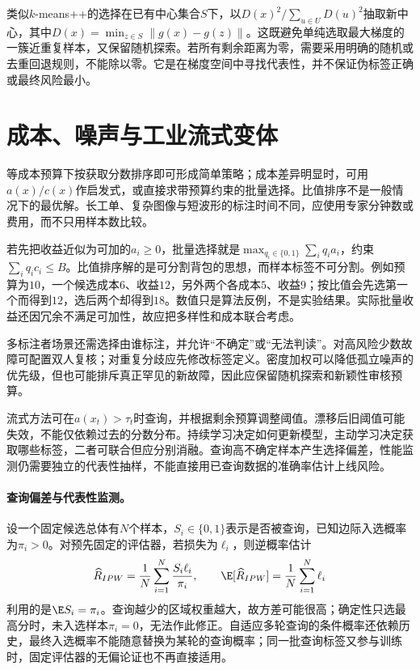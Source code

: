 类似$k$-means++的选择在已有中心集合$S$下，以$D(x)^2/\sum_{u\in U}D(u)^2$抽取新中心，其中$D(x)=\min_{z\in S}\|g(x)-g(z)\|$。这既避免单纯选取最大梯度的一簇近重复样本，又保留随机探索。若所有剩余距离为零，需要采用明确的随机或去重回退规则，不能除以零。它是在梯度空间中寻找代表性，并不保证伪标签正确或最终风险最小。

\section{成本、噪声与工业流式变体}
等成本预算下按获取分数排序即可形成简单策略；成本差异明显时，可用$a(x)/c(x)$作启发式，或直接求带预算约束的批量选择。比值排序不是一般情况下的最优解。长工单、复杂图像与短波形的标注时间不同，应使用专家分钟数或费用，而不只用样本数比较。

若先把收益近似为可加的$a_i\geq0$，批量选择就是$\max_{q_i\in\{0,1\}}\sum_iq_ia_i$，约束$\sum_iq_ic_i\leq B$。比值排序解的是可分割背包的思想，而样本标签不可分割。例如预算为$10$，一个候选成本$6$、收益$12$，另外两个各成本$5$、收益$9$；按比值会先选第一个而得到$12$，选后两个却得到$18$。数值只是算法反例，不是实验结果。实际批量收益还因冗余不满足可加性，故应把多样性和成本联合考虑。

多标注者场景还需选择由谁标注，并允许“不确定”或“无法判读”。对高风险少数故障可配置双人复核；对重复分歧应先修改标签定义。密度加权可以降低孤立噪声的优先级，但也可能排斥真正罕见的新故障，因此应保留随机探索和新颖性审核预算。

流式方法可在$a(x_t)>\tau_t$时查询，并根据剩余预算调整阈值。漂移后旧阈值可能失效，不能仅依赖过去的分数分布。持续学习决定如何更新模型，主动学习决定获取哪些标签，二者可联合但应分别消融。查询高不确定样本产生选择偏差，性能监测仍需要独立的代表性抽样，不能直接用已查询数据的准确率估计上线风险。

\paragraph{查询偏差与代表性监测。}
设一个固定候选总体有$N$个样本，$S_i\in\{0,1\}$表示是否被查询，已知边际入选概率为$\pi_i>0$。对预先固定的评估器，若损失为$\ell_i$，则逆概率估计
\begin{equation}
 \widehat R_{IPW}=\frac1N\sum_{i=1}^N\frac{S_i\ell_i}{\pi_i},\qquad
 \E[\widehat R_{IPW}]=\frac1N\sum_{i=1}^N\ell_i
\end{equation}
利用的是$\E S_i=\pi_i$。查询越少的区域权重越大，故方差可能很高；确定性只选最高分时，未入选样本$\pi_i=0$，无法作此修正。自适应多轮查询的条件概率还依赖历史，最终入选概率不能随意替换为某轮的查询概率；同一批查询标签又参与训练时，固定评估器的无偏论证也不再直接适用。

